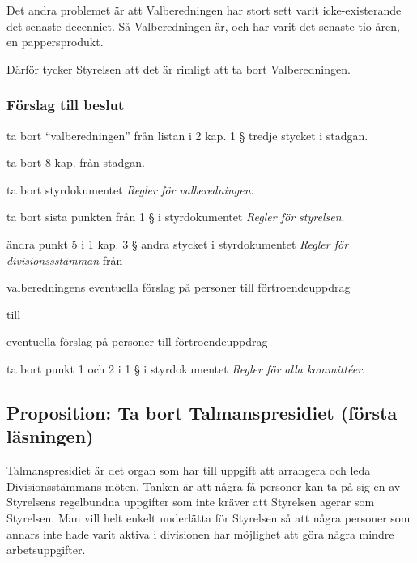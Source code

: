 \documentclass[protokoll]{dvd}
\begin{document}
Det andra problemet är att Valberedningen har stort sett varit icke-existerande det senaste decenniet.
Så Valberedningen är, och har varit det senaste tio åren, en pappersprodukt.

Därför tycker Styrelsen att det är rimligt att ta bort Valberedningen.

\subsubsection*{Förslag till beslut}

\begin{attsatser}
	\item ta bort ``valberedningen'' från listan i 2 kap. 1 § tredje stycket i stadgan.

	\item ta bort 8 kap. från stadgan.

	\item ta bort styrdokumentet \emph{Regler för valberedningen}.

	\item ta bort sista punkten från 1 § i styrdokumentet \emph{Regler för styrelsen}.

	\item ändra punkt 5 i 1 kap. 3 § andra stycket i styrdokumentet \emph{Regler för divisionssstämman} från

	\begin{displayquote}
		valberedningens eventuella förslag på personer till förtroendeuppdrag
	\end{displayquote}

	till

	\begin{displayquote}
		eventuella förslag på personer till förtroendeuppdrag
	\end{displayquote}

	\item ta bort punkt 1 och 2 i 1 § i styrdokumentet \emph{Regler för alla kommittéer}.
\end{attsatser}

\newpage
\subsection{Proposition: Ta bort Talmanspresidiet (första läsningen)}

Talmanspresidiet är det organ som har till uppgift att arrangera och leda Divisionsstämmans möten.
Tanken är att några få personer kan ta på sig en av Styrelsens regelbundna uppgifter som inte kräver att Styrelsen agerar som Styrelsen.
Man vill helt enkelt underlätta för Styrelsen så att några personer som annars inte hade varit aktiva i divisionen har möjlighet att göra några mindre arbetsuppgifter.
\end{document}
